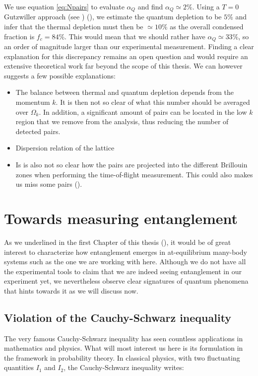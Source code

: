 We use equation \ref{eq:Npairs} to evaluate $\alpha_Q$ and find $\alpha_Q \simeq 2 \%$. Using a $T=0$ Gutzwiller approach (see \cite{bouton_these}) (), we estimate the quantum depletion to be $5\%$ and infer that the thermal depletion must then be $\simeq 10\%$ as the overall condensed fraction is $f_c=84 \%$. This would mean that we should rather have $\alpha_Q \simeq 33 \%$, so an order of magnitude larger than our experimental measurement. Finding a clear explanation for this discrepancy remains an open question and would require an extensive theoretical work far beyond the scope of this thesis. We can however suggests a few possible explanations:

\begin{itemize}
    \item The balance between thermal and quantum depletion depends from the momentum $k$. It is then not so clear of what this number should be averaged over $\Omega_k$. In addition, a significant amount of \kmk pairs can be located in the low $k$ region that we remove from the analysis, thus reducing the number of detected pairs.
    \item Dispersion relation of the lattice 
    \item Is is also not so clear how the pairs are projected into the different Brillouin zones when performing the time-of-flight measurement. This could also makes us miss some pairs ().
\end{itemize}


\section{Towards measuring entanglement}

As we underlined in the first Chapter of this thesis (), it would be of great interest to characterize how entanglement emerges in at-equilibrium many-body systems such as the one we are working with here. Although we do not have all the experimental tools to claim that we are indeed seeing entanglement in our experiment yet, we nevertheless observe clear signatures of quantum phenomena that hints towards it as we will discuss now.

\subsection{Violation of the Cauchy-Schwarz inequality}

The very famous Cauchy-Schwarz inequality has seen countless applications in mathematics and physics. What will most interest us here is its formulation in the framework in probability theory. In classical physics, with two fluctuating quantities $I_1$ and $I_2$, the Cauchy-Schwarz inequality writes:

